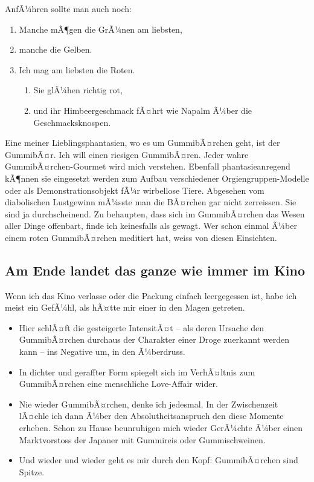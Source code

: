 \documentclass{scrartcl}
\begin{document}
  AnfÃ¼hren sollte man auch noch: 
  \begin{enumerate}
    \item Manche mÃ¶gen die GrÃ¼nen am liebsten,
    \item manche die Gelben.
    \item Ich mag am liebsten die Roten.
    \begin{enumerate}
      \item Sie glÃ¼hen richtig rot,
      \item und ihr Himbeergeschmack fÃ¤hrt wie Napalm Ã¼ber die Geschmacksknospen.
    \end{enumerate}
  \end{enumerate}
  Eine meiner Lieblingsphantasien, wo es um GummibÃ¤rchen geht, ist der GummibÃ¤r. Ich will einen riesigen GummibÃ¤ren. Jeder wahre GummibÃ¤rchen-Gourmet wird mich verstehen. Ebenfall phantasieanregend kÃ¶nnen sie eingesetzt werden zum Aufbau verschiedener Orgiengruppen-Modelle oder als Demonstrationsobjekt fÃ¼r wirbellose Tiere. Abgesehen vom diabolischen Lustgewinn mÃ¼sste man die BÃ¤rchen gar nicht zerreissen. Sie sind ja durchscheinend. Zu behaupten, dass sich im GummibÃ¤rchen das Wesen aller Dinge offenbart, finde ich keinesfalls als gewagt. Wer schon einmal Ã¼ber einem roten GummibÃ¤rchen meditiert hat, weiss von diesen Einsichten.

  \subsection[Im Kino]{Am Ende landet das ganze wie immer im Kino}

  Wenn ich das Kino verlasse oder die Packung einfach leergegessen ist, habe ich meist ein GefÃ¼hl, als hÃ¤tte mir einer in den Magen getreten.
  \begin{itemize}
    \item Hier schlÃ¤ft die gesteigerte IntensitÃ¤t -- als deren Ursache den GummibÃ¤rchen durchaus der Charakter einer Droge zuerkannt werden kann -- ins Negative um, in den Ã¼berdruss.
    \item In dichter und geraffter Form spiegelt sich im VerhÃ¤ltnis zum GummibÃ¤rchen eine menschliche Love-Affair wider.
    \item Nie wieder GummibÃ¤rchen, denke ich jedesmal. In der Zwischenzeit lÃ¤chle ich dann Ã¼ber den Absolutheitsanspruch den diese Momente erheben. Schon zu Hause beunruhigen mich wieder GerÃ¼chte Ã¼ber einen Marktvorstoss der Japaner mit Gummireis oder Gummischweinen.
    \item Und wieder und wieder geht es mir durch den Kopf: GummibÃ¤rchen sind Spitze.
  \end{itemize}
\end{document}
